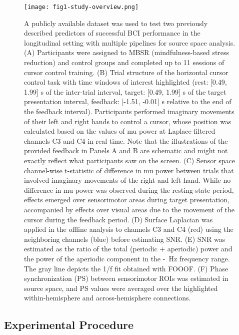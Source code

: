 \begin{figure}[htbp]
    \centering
    \texttt{[image: fig1-study-overview.png]}
    \caption{A publicly available dataset \citep{Stieger2021_dataset} was used to test two previously described predictors of successful BCI performance \citep{Blankertz2010, Vidaurre2020} in the longitudinal setting with multiple pipelines for source space analysis. (A) Participants were assigned to MBSR (mindfulness-based stress reduction) and control groups and completed up to 11 sessions of cursor control training. (B) Trial structure of the horizontal cursor control task with time windows of interest highlighted (rest: [0.49, 1.99] s of the inter-trial interval, target: [0.49, 1.99] s of the target presentation interval, feedback: [-1.51, -0.01] s relative to the end of the feedback interval). Participants performed imaginary movements of their left and right hands to control a cursor, whose position was calculated based on the values of mu power at Laplace-filtered channels C3 and C4 in real time. Note that the illustrations of the provided feedback in Panels A and B are schematic and might not exactly reflect what participants saw on the screen. (C) Sensor space channel-wise t-statistic of difference in mu power between trials that involved imaginary movements of the right and left hand. While no difference in mu power was observed during the resting-state period, effects emerged over sensorimotor areas during target presentation, accompanied by effects over visual areas due to the movement of the cursor during the feedback period. (D) Surface Laplacian was applied in the offline analysis to channels C3 and C4 (red) using the neighboring channels (blue) before estimating SNR. (E) SNR was estimated as the ratio of the total (periodic + aperiodic) power and the power of the aperiodic component in the \muLow-\muHigh~Hz frequency range. The gray line depicts the 1/f fit obtained with FOOOF. (F) Phase synchronization (PS) between sensorimotor ROIs was estimated in source space, and PS values were averaged over the highlighted within-hemisphere and across-hemisphere connections.}
    \label{fig:study_overview}
\end{figure}

\subsection{Experimental Procedure}

